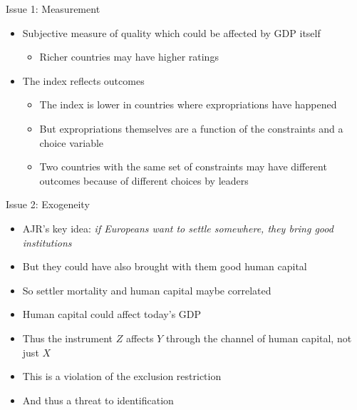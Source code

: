 \documentclass[11pt,notes=hide,aspectratio=169,mathserif]{beamer}
\begin{document}
    
\begin{frame}{Issue 1: Measurement}
\begin{itemize}
\item Subjective measure of quality which could be affected by GDP itself
\begin{itemize}
    \item Richer countries may have higher ratings 
\end{itemize}
\item The index reflects outcomes
\begin{itemize}
    \item The index is lower in countries where expropriations have happened
    \item But expropriations themselves are a function of the constraints and a choice variable
    \item Two countries with the same set of constraints may have different outcomes because of different choices by leaders
\end{itemize}
\end{itemize}
\end{frame}

\begin{frame}{Issue 2: Exogeneity}
\begin{itemize}
\item AJR's key idea: \textit<overlay specification>{if Europeans want to settle somewhere, they bring good institutions}
\item But they could have also brought with them good human capital
\item So settler mortality and human capital maybe correlated
\item Human capital could affect today's GDP
\item Thus the instrument $Z$ affects $Y$ through the channel of human capital, not just $X$
\item This is a violation of the exclusion restriction
\item And thus a threat to identification
\end{itemize}
\end{frame}
\end{document}
